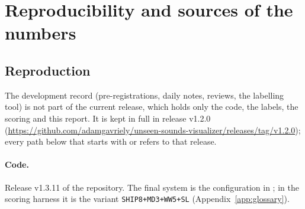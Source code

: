 \section{Reproducibility and sources of the numbers}\label{app:sources}
\subsection{Reproduction}\label{sec:repro}
The development record (pre-registrations, daily notes, reviews, the labelling tool) is not part of the current release, which holds only the code, the labels, the scoring and this report. It is kept in full in release v1.2.0 (\url{https://github.com/adamgavriely/unseen-sounds-visualizer/releases/tag/v1.2.0}); every path below that starts with  or  refers to that release.

\paragraph{Code.} Release v1.3.11 of the repository. The final system is the configuration 
in ; in the scoring harness it is the variant \texttt{SHIP8+MD3+WW5+SL} (Appendix~\ref{app:glossary}).

